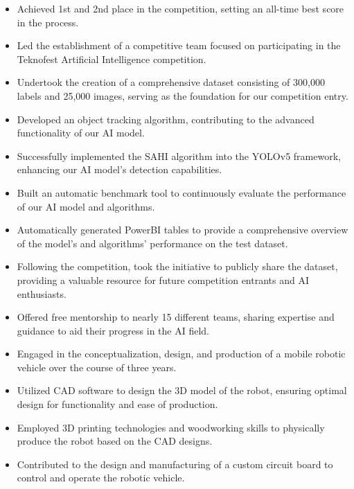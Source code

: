 \documentclass[10pt,a4paper,ragged2e,withhyper]{altacv}
\begin{document}
\begin{paracol}{2}
\begin{itemize}
  \item Achieved 1st and 2nd place in the competition, setting an all-time best score in the process.
  \item Led the establishment of a competitive team focused on participating in the Teknofest Artificial Intelligence competition.
  \item Undertook the creation of a comprehensive dataset consisting of 300,000 labels and 25,000 images, serving as the foundation for our competition entry.
  \item Developed an object tracking algorithm, contributing to the advanced functionality of our AI model.
  \item Successfully implemented the SAHI algorithm into the YOLOv5 framework, enhancing our AI model's detection capabilities.
  \item Built an automatic benchmark tool to continuously evaluate the performance of our AI model and algorithms.
  \item Automatically generated PowerBI tables to provide a comprehensive overview of the model's and algorithms' performance on the test dataset.
  \item Following the competition, took the initiative to publicly share the dataset, providing a valuable resource for future competition entrants and AI enthusiasts.
  \item Offered free mentorship to nearly 15 different teams, sharing expertise and guidance to aid their progress in the AI field.
\end{itemize}
\divider
{}
\begin{itemize}
  \item Engaged in the conceptualization, design, and production of a mobile robotic vehicle over the course of three years.
  \item Utilized CAD software to design the 3D model of the robot, ensuring optimal design for functionality and ease of production.
  \item Employed 3D printing technologies and woodworking skills to physically produce the robot based on the CAD designs.
  \item Contributed to the design and manufacturing of a custom circuit board to control and operate the robotic vehicle.

\end{itemize}
\end{paracol}
\end{document}
